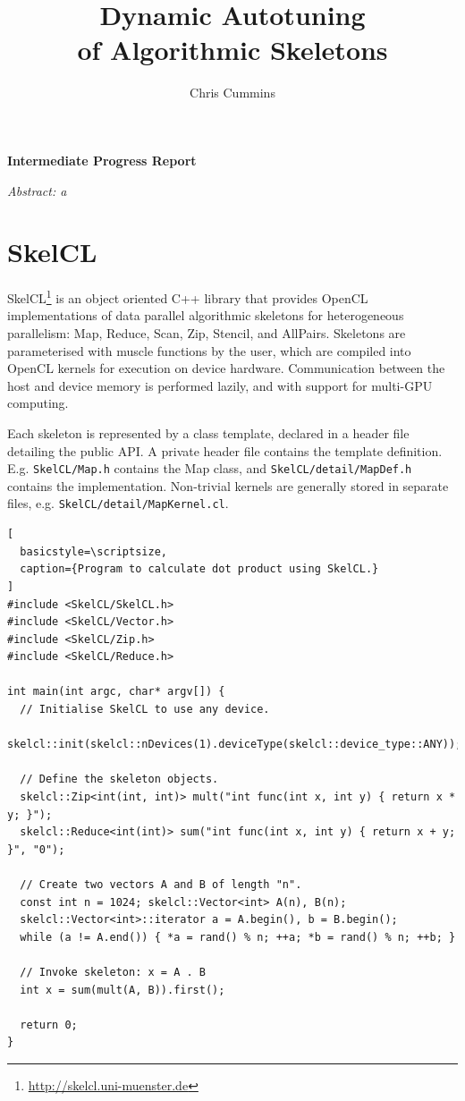 
\title{Dynamic Autotuning\\of Algorithmic Skeletons}

\author{Chris Cummins}





\begin{center}
  \huge
  \vspace{0.9cm}
  \textbf{Intermediate Progress Report}
\end{center}

\noindent
\textit{Abstract: %
a
}

\section*{SkelCL}

SkelCL\footnote{\url{http://skelcl.uni-muenster.de}} is an object
oriented C++ library that provides OpenCL implementations of data
parallel algorithmic skeletons for heterogeneous parallelism: Map,
Reduce, Scan, Zip, Stencil, and AllPairs. Skeletons are parameterised
with muscle functions by the user, which are compiled into OpenCL
kernels for execution on device hardware. Communication between the
host and device memory is performed lazily, and with support for
multi-GPU computing.

Each skeleton is represented by a class template, declared in a header
file detailing the public API. A private header file contains the
template definition. E.g. \texttt{SkelCL/Map.h} contains the Map
class, and \texttt{SkelCL/detail/MapDef.h} contains the
implementation. Non-trivial kernels are generally stored in separate
files, e.g. \texttt{SkelCL/detail/MapKernel.cl}.

\lstset{language=C++}
\begin{lstlisting}[
  basicstyle=\scriptsize,
  caption={Program to calculate dot product using SkelCL.}
]
#include <SkelCL/SkelCL.h>
#include <SkelCL/Vector.h>
#include <SkelCL/Zip.h>
#include <SkelCL/Reduce.h>

int main(int argc, char* argv[]) {
  // Initialise SkelCL to use any device.
  skelcl::init(skelcl::nDevices(1).deviceType(skelcl::device_type::ANY));

  // Define the skeleton objects.
  skelcl::Zip<int(int, int)> mult("int func(int x, int y) { return x * y; }");
  skelcl::Reduce<int(int)> sum("int func(int x, int y) { return x + y; }", "0");

  // Create two vectors A and B of length "n".
  const int n = 1024; skelcl::Vector<int> A(n), B(n);
  skelcl::Vector<int>::iterator a = A.begin(), b = B.begin();
  while (a != A.end()) { *a = rand() % n; ++a; *b = rand() % n; ++b; }

  // Invoke skeleton: x = A . B
  int x = sum(mult(A, B)).first();

  return 0;
}
\end{lstlisting}

